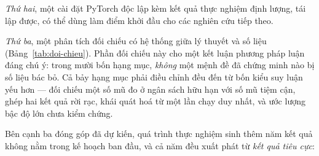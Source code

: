 \emph{Thứ hai}, một cài đặt PyTorch độc lập kèm kết quả thực nghiệm định lượng,
tái lập được, có thể dùng làm điểm khởi đầu cho các nghiên cứu tiếp theo.

\emph{Thứ ba}, một phân tích đối chiếu có hệ thống giữa lý thuyết và số liệu
(Bảng~\ref{tab:doi-chieu}). Phần đối chiếu này cho một kết luận phương pháp luận
đáng chú ý: trong mười bốn hạng mục, \emph{không} một mệnh đề đã chứng minh nào
bị số liệu bác bỏ. Cả bảy hạng mục phải điều chỉnh đều đến từ bốn kiểu suy luận
yếu hơn --- đối chiếu một số mũ đo ở ngân sách hữu hạn với số mũ tiệm cận, ghép
hai kết quả rời rạc, khái quát hoá từ một lần chạy duy nhất, và ước lượng bậc độ
lớn chưa kiểm chứng.

Bên cạnh ba đóng góp đã dự kiến, quá trình thực nghiệm sinh thêm năm kết quả
không nằm trong kế hoạch ban đầu, và cả năm đều xuất phát từ \emph{kết quả tiêu
cực}:


